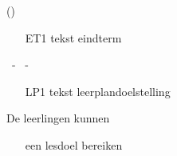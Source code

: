\begin{frame}
(\theleerplanurl)
\helpeindtermen

    \begin{enumerate}
        \item[ET1]{tekst eindterm}
    \end{enumerate}

\thekoepel ~- \theleerplannummer ~- \theleerplanurl
\helpleerplandoel
    \begin{enumerate}
        \item[LP1]{tekst leerplandoelstelling}
    \end{enumerate}

\helplesdoel

De leerlingen kunnen
    \begin{enumerate}
        \item[\namedlabel{lesdoel:lesdoel}{LD1}]{een lesdoel bereiken}
    \end{enumerate}
    
\end{frame}
\endgroup